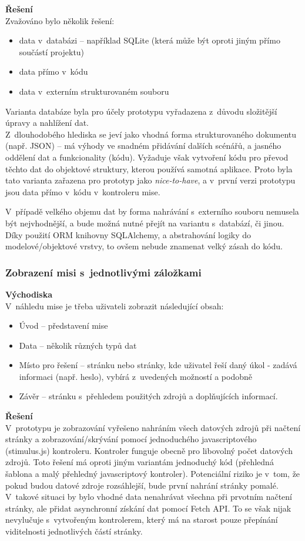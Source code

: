 	\textbf{Řešení}\\
	Zvažováno bylo několik řešení:
	
	\begin{itemize}
		\item data v~databázi -- například SQLite (která může být oproti jiným přímo součástí projektu)
		\item data přímo v~kódu
		\item data v~externím strukturovaném souboru
	\end{itemize}

	Varianta databáze byla pro účely prototypu vyřadazena z~důvodu složitější úpravy a nahlížení dat. \\
	Z~dlouhodobého hlediska se jeví jako vhodná forma strukturovaného dokumentu (např. JSON) -- má výhody ve snadném přidávání dalších scénářů, a jasného oddělení dat a funkcionality (kódu). Vyžaduje však vytvoření kódu pro převod těchto dat do objektové struktury, kterou používá samotná aplikace.
	Proto byla tato varianta zařazena pro prototyp jako \textit{nice-to-have}, a v~první verzi prototypu jsou data přímo v~kódu v~kontroleru mise.

	V~případě velkého objemu dat by forma nahrávání s~externího souboru nemusela být nejvhodnější, a bude možná nutné přejít na variantu s~databází, či jinou. Díky použití ORM knihovny SQLAlchemy, a abstrahování logiky do modelové/objektové vrstvy, to ovšem nebude znamenat velký zásah do kódu. 

\subsubsection*{Zobrazení misi s~jednotlivými záložkami}
	\textbf{Východiska}\\
	V~náhledu mise je třeba uživateli zobrazit následující obsah:
	
	\begin{itemize}
		\item Úvod -- představení mise
		\item Data -- několik různých typů dat
		\item Místo pro řešení -- stránku nebo stránky, kde uživatel řeší daný úkol - zadává informaci (např. heslo), vybírá z~uvedených možností a podobně
		\item Závěr -- stránku s~přehledem použitých zdrojů a doplňujících informací. 
	\end{itemize}	

	\textbf{Řešení}\\
	V~prototypu je zobrazování vyřešeno nahráním všech datových zdrojů při načtení stránky a zobrazování/skrývání pomocí jednoduchého javascriptového (stimulus.js) kontroleru. Kontroler funguje obecně pro libovolný počet datových zdrojů.
	Toto řešení má oproti jiným variantám jednoduchý kód (přehledná šablona a malý přehledný javascriptový kontroler).
	Potenciální riziko je v~tom, že pokud budou datové zdroje rozsáhlejší, bude první nahrání stránky pomalé. V~takové situaci by bylo vhodné data nenahrávat všechna při prvotním načtení stránky, ale přidat asynchronní získání dat pomocí Fetch API. To se však nijak nevylučuje s~vytvořeným kontrolerem, který má na starost pouze přepínání viditelnosti jednotlivých částí stránky.

